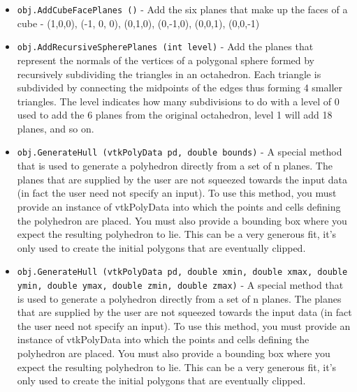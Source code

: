 \begin{itemize}
\item  \verb|obj.AddCubeFacePlanes ()| -  Add the six planes that make up the faces of a cube - (1,0,0),
 (-1, 0, 0), (0,1,0), (0,-1,0), (0,0,1), (0,0,-1)

\item  \verb|obj.AddRecursiveSpherePlanes (int level)| -  Add the planes that represent the normals of the vertices of a
 polygonal sphere formed by recursively subdividing the triangles
 in an octahedron.  Each triangle is subdivided by connecting the
 midpoints of the edges thus forming 4 smaller triangles. The
 level indicates how many subdivisions to do with a level of 0
 used to add the 6 planes from the original octahedron, level 1
 will add 18 planes, and so on.

\item  \verb|obj.GenerateHull (vtkPolyData pd, double bounds)| -  A special method that is used to generate a polyhedron directly
 from a set of n planes. The planes that are supplied by the user
 are not squeezed towards the input data (in fact the user need
 not specify an input). To use this method, you must provide an
 instance of vtkPolyData into which the points and cells defining
 the polyhedron are placed. You must also provide a bounding box
 where you expect the resulting polyhedron to lie. This can be
 a very generous fit, it's only used to create the initial polygons
 that are eventually clipped.

\item  \verb|obj.GenerateHull (vtkPolyData pd, double xmin, double xmax, double ymin, double ymax, double zmin, double zmax)| -  A special method that is used to generate a polyhedron directly
 from a set of n planes. The planes that are supplied by the user
 are not squeezed towards the input data (in fact the user need
 not specify an input). To use this method, you must provide an
 instance of vtkPolyData into which the points and cells defining
 the polyhedron are placed. You must also provide a bounding box
 where you expect the resulting polyhedron to lie. This can be
 a very generous fit, it's only used to create the initial polygons
 that are eventually clipped.

\end{itemize}

